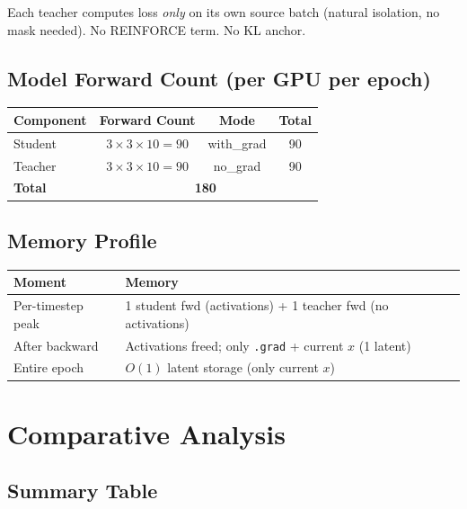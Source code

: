\documentclass[11pt]{article}
\begin{document}
Each teacher computes loss \emph{only} on its own source batch (natural isolation, no mask needed). No REINFORCE term. No KL anchor.

\subsection{Model Forward Count (per GPU per epoch)}

\begin{table}[h]
\centering
\begin{tabular}{lccc}
\toprule
Component & Forward Count & Mode & Total \\
\midrule
Student & $3 \times 3 \times 10 = 90$ & with\_grad & 90 \\
Teacher & $3 \times 3 \times 10 = 90$ & no\_grad & 90 \\
\midrule
\textbf{Total} & \multicolumn{3}{c}{\textbf{180}} \\
\bottomrule
\end{tabular}
\end{table}

\subsection{Memory Profile}

\begin{table}[h]
\centering
\begin{tabular}{ll}
\toprule
Moment & Memory \\
\midrule
Per-timestep peak & 1 student fwd (activations) + 1 teacher fwd (no activations) \\
After backward & Activations freed; only \texttt{.grad} + current $x$ (1 latent) \\
Entire epoch & $O(1)$ latent storage (only current $x$) \\
\bottomrule
\end{tabular}
\end{table}

\section{Comparative Analysis}

\subsection{Summary Table}
\end{document}
